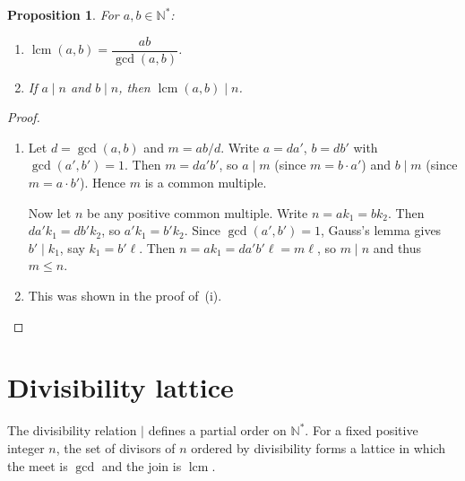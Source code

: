 \documentclass[12pt,a4paper,openany]{book}
\theoremstyle{definition}
\theoremstyle{plain}
\newtheorem{proposition}[definition]{Proposition}
\theoremstyle{remark}
\newcommand{\N}{\mathbb{N}}
\DeclareMathOperator{\lcm}{lcm}
\begin{document}
\begin{proposition}
\label{prop:lcm-properties}
For $a, b \in \N^{*}$:
\begin{enumerate}[label=(\roman*)]
  \item $\lcm(a,b) = \dfrac{ab}{\gcd(a,b)}$.
  \item If $a \mid n$ and $b \mid n$, then $\lcm(a,b) \mid n$.
\end{enumerate}
\end{proposition}

\begin{proof}
\begin{enumerate}[label=(\roman*)]
  \item Let $d = \gcd(a,b)$ and $m = ab/d$. Write $a = da'$, $b = db'$ with
        $\gcd(a',b') = 1$. Then $m = da'b'$, so $a \mid m$ (since $m = b \cdot a'$)
        and $b \mid m$ (since $m = a \cdot b'$). Hence $m$ is a common multiple.

        Now let $n$ be any positive common multiple. Write $n = ak_1 = bk_2$. Then
        $da'k_1 = db'k_2$, so $a'k_1 = b'k_2$. Since $\gcd(a',b') = 1$, Gauss's
        lemma gives $b' \mid k_1$, say $k_1 = b'\ell$. Then
        $n = a k_1 = da'b'\ell = m\ell$, so $m \mid n$ and thus $m \le n$.
  \item This was shown in the proof of~(i). \qedhere
\end{enumerate}
\end{proof}

\section{Divisibility lattice}
\label{sec:divisibility-lattice}

The divisibility relation $\mid$ defines a partial order on $\N^{*}$.
For a fixed positive integer $n$, the set of divisors of $n$ ordered by
divisibility forms a lattice in which the meet is $\gcd$ and the join is $\lcm$.
\end{document}
